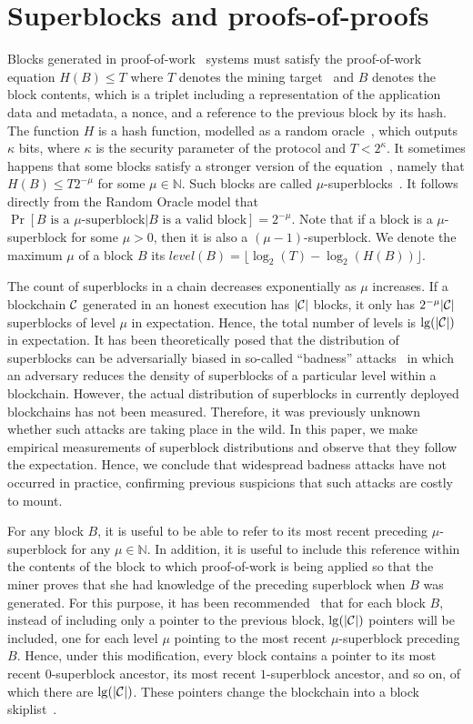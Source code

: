 \section{Superblocks and proofs-of-proofs}

Blocks generated in proof-of-work~\cite{C:DwoNao92} systems must satisfy the
proof-of-work equation $H(B) \leq T$ where $T$ denotes the mining
target~\cite{SP:BMCNKF15} and $B$ denotes the block contents, which is a triplet
including a representation of the application data and metadata, a nonce, and a
reference to the previous block by its hash. The function $H$ is a hash
function, modelled as a random oracle~\cite{CCS:BelRog93}, which outputs
$\kappa$ bits, where $\kappa$ is the security parameter of the protocol and $T <
2^\kappa$. It sometimes happens that some blocks satisfy a stronger version of
the equation~\cite{popow}, namely that $H(B) \leq T2^{-\mu}$ for some $\mu \in
\mathbb{N}$. Such blocks are called $\mu$-superblocks~\cite{nipopows}.
It follows directly from the Random Oracle model that
$\Pr[B \text{ is a } \mu\text{-superblock}|B \text{ is a valid block}] = 2^{-\mu}$. Note that if a block is a $\mu$-superblock for some $\mu > 0$, then it is
also a $(\mu - 1)$-superblock. We denote the maximum $\mu$ of a block $B$ its
$level(B) = \lfloor \log_2(T) - \log_2(H(B)) \rfloor$.

The count of superblocks in a chain decreases exponentially as $\mu$ increases.
If a blockchain $\mathcal{C}$ generated in an honest execution has $|\mathcal{C}|$ blocks,
it only has $2^{-\mu}|\mathcal{C}|$ superblocks of level $\mu$ in expectation. Hence,
the total number of levels is $\lg(|\mathcal{C}|)$ in expectation. It has been
theoretically posed that the distribution of superblocks can be adversarially
biased in so-called ``badness'' attacks~\cite{nipopows} in which an adversary
reduces the density of superblocks of a particular level within a blockchain.
However, the actual distribution of superblocks in currently deployed
blockchains has not been measured. Therefore, it was previously unknown whether
such attacks are taking place in the wild. In this paper, we make empirical
measurements of superblock distributions and observe that they follow the
expectation. Hence, we conclude that widespread badness attacks have not
occurred in practice, confirming previous suspicions that such attacks are
costly to mount.

For any block $B$,
it is useful to be able to refer to its most recent preceding $\mu$-superblock
for any $\mu \in \mathbb{N}$. In addition, it is useful to include this
reference within the contents of the block to which proof-of-work is being applied
so that the miner proves that she had knowledge of the preceding superblock
when $B$ was generated. For this purpose, it has been
recommended~\cite{nipopows} that for each block $B$, instead of including only a
pointer to the previous block, $\lg(|\mathcal{C}|)$ pointers will be included, one
for each level $\mu$ pointing to the most recent $\mu$-superblock preceding $B$.
Hence, under this modification, every block contains a pointer to its most
recent $0$-superblock ancestor, its most recent $1$-superblock ancestor, and so
on, of which there are $\lg(|\mathcal{C}|)$. These pointers change the blockchain
into a block skiplist~\cite{skiplist,papadakis1993skip}.

